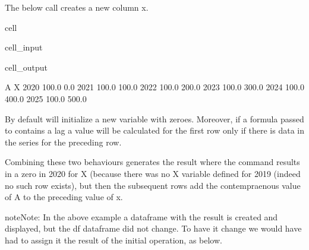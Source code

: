 \documentclass[letterpaper,10pt,english]{jupyterBook}
\begin{document}
\sphinxAtStartPar
The below call creates a new column x.

\begin{sphinxuseclass}{cell}\begin{sphinxVerbatimInput}

\begin{sphinxuseclass}{cell_input}
\begin{sphinxVerbatim}[commandchars=\\\{\}]
\end{sphinxVerbatim}

\end{sphinxuseclass}\end{sphinxVerbatimInput}
\begin{sphinxVerbatimOutput}

\begin{sphinxuseclass}{cell_output}
\begin{sphinxVerbatim}[commandchars=\\\{\}]
          A      X
2020  100.0    0.0
2021  100.0  100.0
2022  100.0  200.0
2023  100.0  300.0
2024  100.0  400.0
2025  100.0  500.0
\end{sphinxVerbatim}

\end{sphinxuseclass}\end{sphinxVerbatimOutput}

\end{sphinxuseclass}
\sphinxAtStartPar
{}

\sphinxAtStartPar
By default  will initialize a new variable with zeroes.
Moreover, if a formula passed to  contains a lag a value will be calculated for the first row only if there is data in the series for the preceding row.

\sphinxAtStartPar
Combining these two behaviours generates the result where the command  results in a zero in 2020 for X (because there was no X variable defined for 2019 (indeed no such row exists), but then the subsequent rows add the contempraenous value of A to the preceding value of x.

\begin{sphinxadmonition}{note}{Note:}
\sphinxAtStartPar
In the above example a  dataframe with the result is created and displayed, but the df dataframe did not change.  To have it change we would have had to assign it the result of the initial operation, as below.
\end{sphinxadmonition}
\end{document}
